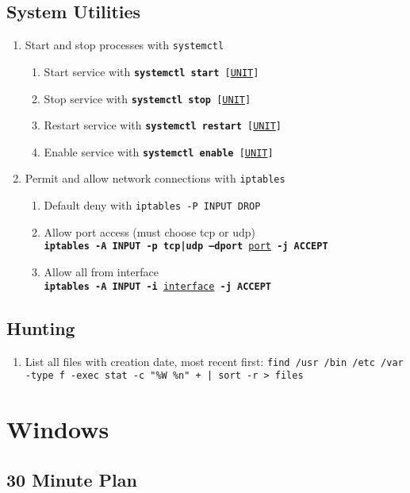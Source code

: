 \documentclass[12pt,letterpaper]{article}
\def\code#1{\textcolor{c2}{\texttt{#1}}}
\def\bf#1{\textbf{#1}}
\def\ul#1{\underline{#1}}
\begin{document}
\subsection{System Utilities}

\begin{enumerate}
	\item Start and stop processes with \code{systemctl}
	\begin{enumerate}
		\item Start service with \code{\bf{systemctl start} [\ul{UNIT}]}
		\item Stop service with \code{\bf{systemctl stop} [\ul{UNIT}]}
		\item Restart service with \code{\bf{systemctl restart} [\ul{UNIT}]}
		\item Enable service with \code{\bf{systemctl enable} [\ul{UNIT}]}
	\end{enumerate}
	\item Permit and allow network connections with \code{iptables}
	\begin{enumerate}
		\item Default deny with \code{iptables -P INPUT DROP}
		\item Allow port access (must choose tcp or udp) \\
			\code{\bf{iptables -A INPUT -p tcp|udp --dport} \ul{port} \bf{-j ACCEPT}}
		\item Allow all from interface \\
			\code{\bf{iptables -A INPUT -i} \ul{interface} \bf{-j ACCEPT}}
	\end{enumerate}
\end{enumerate}

\subsection{Hunting}

\begin{enumerate}
	\item List all files with creation date, most recent first: \code{find /usr /bin /etc /var -type f -exec stat -c "\%W \%n" {} + | sort -r > files}
\end{enumerate}

\pagebreak

\section{Windows}

\subsection{30 Minute Plan}
\end{document}
